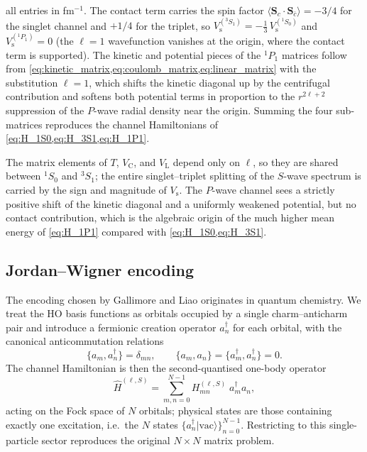 all entries in fm$^{-1}$. The contact term carries the spin factor
$\langle\mathbf{S}_c\cdot\mathbf{S}_{\bar c}\rangle = -3/4$ for the
singlet channel and $+1/4$ for the triplet, so
$V_{\mathrm{s}}^{({}^3S_1)} = -\tfrac{1}{3}\,V_{\mathrm{s}}^{({}^1S_0)}$
and $V_{\mathrm{s}}^{({}^1P_1)} = 0$ (the $\ell=1$ wavefunction vanishes
at the origin, where the contact term is supported). The kinetic and
potential pieces of the ${}^1P_1$ matrices follow from \cref{eq:kinetic_matrix,eq:coulomb_matrix,eq:linear_matrix}
with the substitution $\ell=1$, which shifts the kinetic diagonal up by
the centrifugal contribution and softens both potential terms in
proportion to the $r^{2\ell+2}$ suppression of the $P$-wave radial
density near the origin. Summing the four sub-matrices reproduces the
channel Hamiltonians of \cref{eq:H_1S0,eq:H_3S1,eq:H_1P1}.

\begin{remark}
The matrix elements of $T$, $V_{\mathrm{C}}$, and $V_{\mathrm{L}}$
depend only on $\ell$, so they are shared between ${}^1S_0$ and
${}^3S_1$; the entire singlet--triplet splitting of the $S$-wave
spectrum is carried by the sign and magnitude of $V_{\mathrm{s}}$. The
$P$-wave channel sees a strictly positive shift of the kinetic
diagonal and a uniformly weakened potential, but no contact
contribution, which is the algebraic origin of the much higher mean
energy of \cref{eq:H_1P1} compared with \cref{eq:H_1S0,eq:H_3S1}.
\end{remark}

\subsection{Jordan--Wigner encoding}
\label{ssec:jw_encoding}

The encoding chosen by Gallimore and Liao originates in quantum chemistry.
We treat the HO basis functions as orbitals occupied by a single
charm--anticharm pair and introduce a fermionic creation operator
$a_n^{\dagger}$ for each orbital, with the canonical anticommutation
relations
\begin{equation}
  \label{eq:fermion_anticom}
  \{a_m, a_n^{\dagger}\} = \delta_{mn},
  \qquad
  \{a_m, a_n\} = \{a_m^{\dagger}, a_n^{\dagger}\} = 0.
\end{equation}
The channel Hamiltonian is then the second-quantised one-body operator
\begin{equation}
  \label{eq:second_quantised}
  \widehat{H}^{(\ell,S)} =
    \sum_{m,n=0}^{N-1} H_{mn}^{(\ell,S)}\;a_m^{\dagger} a_n,
\end{equation}
acting on the Fock space of $N$ orbitals; physical states are those
containing exactly one excitation, i.e.\ the $N$ states
$\{a_n^{\dagger}|\mathrm{vac}\rangle\}_{n=0}^{N-1}$. Restricting to this
single-particle sector reproduces the original $N\times N$ matrix problem.

